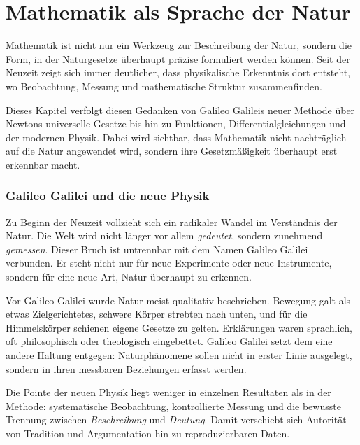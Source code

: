 \chapter{Mathematik als Sprache der Natur}
\label{chap:IV_sprache}
Mathematik ist nicht nur ein Werkzeug zur Beschreibung der Natur,
sondern die Form, in der Naturgesetze überhaupt präzise formuliert werden können.
Seit der Neuzeit zeigt sich immer deutlicher,
dass physikalische Erkenntnis dort entsteht,
wo Beobachtung, Messung und mathematische Struktur zusammenfinden.

Dieses Kapitel verfolgt diesen Gedanken
von Galileo Galileis neuer Methode
über Newtons universelle Gesetze
bis hin zu Funktionen, Differentialgleichungen
und der modernen Physik.
Dabei wird sichtbar,
dass Mathematik nicht nachträglich auf die Natur angewendet wird,
sondern ihre Gesetzmäßigkeit überhaupt erst erkennbar macht.
\subsection{Galileo Galilei und die neue Physik}

Zu Beginn der Neuzeit vollzieht sich ein radikaler Wandel im Verständnis der Natur.
Die Welt wird nicht länger vor allem \emph{gedeutet}, sondern zunehmend \emph{gemessen}.
Dieser Bruch ist untrennbar mit dem Namen Galileo Galilei verbunden.
Er steht nicht nur für neue Experimente oder neue Instrumente,
sondern für eine neue Art, Natur überhaupt zu erkennen.

Vor Galileo Galilei wurde Natur meist qualitativ beschrieben.
Bewegung galt als etwas Zielgerichtetes,
schwere Körper \glqq strebten\grqq{} nach unten,
und für die Himmelskörper schienen eigene Gesetze zu gelten.
Erklärungen waren sprachlich, oft philosophisch oder theologisch eingebettet.
Galileo Galilei setzt dem eine andere Haltung entgegen:
Naturphänomene sollen nicht in erster Linie ausgelegt,
sondern in ihren messbaren Beziehungen erfasst werden.

\begin{HistoryBox}
	\label{box:messen}
	Die Pointe der \glqq neuen Physik\grqq{} liegt weniger in einzelnen Resultaten
	als in der Methode:
	systematische Beobachtung, kontrollierte Messung
	und die bewusste Trennung zwischen \emph{Beschreibung} und \emph{Deutung}.
	Damit verschiebt sich Autorität
	von Tradition und Argumentation
	hin zu reproduzierbaren Daten.
\end{HistoryBox}

